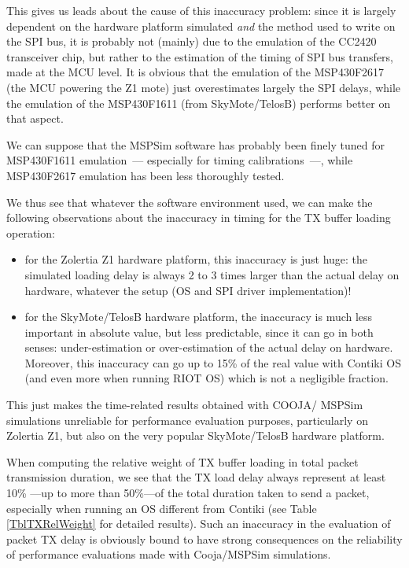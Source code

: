 \documentclass[10pt,emptycopyrightspace]{ewsn-proc}
\begin{document}
\medskip

This gives us leads about the cause of this inaccuracy problem: since it
is largely dependent on the hardware platform simulated \emph{and} the method
used to write on the SPI bus, it is probably not (mainly) due to the
emulation of the CC2420 transceiver chip, but rather to the estimation of
the timing of SPI bus transfers, made at the MCU level.
It is obvious that the emulation of the MSP430F2617 (the MCU powering the
Z1 mote) just overestimates largely the SPI delays, while the emulation
of the MSP430F1611 (from SkyMote/TelosB) performs better on that aspect.

We can suppose that the MSPSim software has probably been finely tuned for
MSP430F1611 emulation~--- especially for timing calibrations~---, while
MSP430F2617 emulation has been less thoroughly tested.

\bigskip

We thus see that whatever the software environment used, we can make the
following observations about the inaccuracy in timing for the TX buffer
loading operation:
\begin{itemize}
\item for the Zolertia Z1 hardware platform, this inaccuracy is just huge:
the simulated loading delay is always 2 to 3 times larger than the actual
delay on hardware, whatever the setup (OS and SPI driver implementation)!
\item for the SkyMote/TelosB hardware platform, the inaccuracy is much less
important in absolute value, but less predictable, since it can go in both
senses: under-estimation or over-estimation of the actual delay on hardware.
Moreover, this inaccuracy can go up to 15\% of the real value with Contiki
OS (and even more when running RIOT OS) which is not a negligible fraction.
\end{itemize}
\smallskip
This just makes the time-related results obtained with COOJA/ MSPSim
simulations unreliable for performance evaluation purposes, particularly
on Zolertia Z1, but also on the very popular SkyMote/TelosB hardware platform.

\medskip

When computing the relative weight of TX buffer loading in total packet
transmission duration, we see that the TX load delay always represent at
least 10\% ---up to more than 50\%---of the total duration taken to send
a packet, especially when running an OS different from Contiki (see Table
\ref{TblTXRelWeight} for detailed results).
Such an inaccuracy in the evaluation of packet TX delay is obviously bound
to have strong consequences on the reliability of performance evaluations
made with Cooja/MSPSim simulations.
\end{document}
